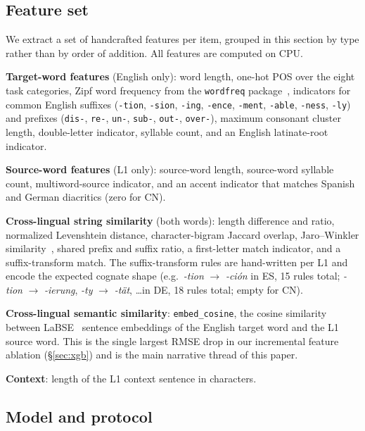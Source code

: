 \documentclass[11pt]{article}
\begin{document}
\subsection{Feature set}

We extract a set of handcrafted features per item, grouped in this section by type rather than by order of addition. All features are computed on CPU.

\textbf{Target-word features} (English only): word length, one-hot POS over the eight task categories, Zipf word frequency from the \texttt{wordfreq} package~\citep{speer2022wordfreq}, indicators for common English suffixes (\texttt{-tion}, \texttt{-sion}, \texttt{-ing}, \texttt{-ence}, \texttt{-ment}, \texttt{-able}, \texttt{-ness}, \texttt{-ly}) and prefixes (\texttt{dis-}, \texttt{re-}, \texttt{un-}, \texttt{sub-}, \texttt{out-}, \texttt{over-}), maximum consonant cluster length, double-letter indicator, syllable count, and an English latinate-root indicator.

\textbf{Source-word features} (L1 only): source-word length, source-word syllable count, multiword-source indicator, and an accent indicator that matches Spanish and German diacritics (zero for CN).

\textbf{Cross-lingual string similarity} (both words): length difference and ratio, normalized Levenshtein distance, character-bigram Jaccard overlap, Jaro--Winkler similarity~\citep{winkler1990string}, shared prefix and suffix ratio, a first-letter match indicator, and a suffix-transform match. The suffix-transform rules are hand-written per L1 and encode the expected cognate shape (e.g.\ \textit{-tion} $\rightarrow$ \textit{-ción} in ES, 15 rules total; \textit{-tion} $\rightarrow$ \textit{-ierung}, \textit{-ty} $\rightarrow$ \textit{-tät}, \ldots in DE, 18 rules total; empty for CN).

\textbf{Cross-lingual semantic similarity}: \texttt{embed\_cosine}, the cosine similarity between LaBSE~\citep{feng2022labse} sentence embeddings of the English target word and the L1 source word. This is the single largest RMSE drop in our incremental feature ablation (\S\ref{sec:xgb}) and is the main narrative thread of this paper.

\textbf{Context}: length of the L1 context sentence in characters.

\subsection{Model and protocol}
\end{document}
